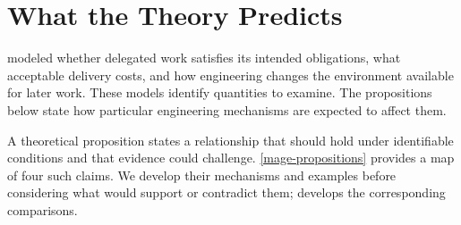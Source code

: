 


\chapter{What the Theory Predicts}


 modeled whether delegated work satisfies its intended obligations, what acceptable delivery costs, and how engineering changes the environment available for later work. These models identify quantities to examine. The propositions below state how particular engineering mechanisms are expected to affect them.

A theoretical proposition states a relationship that should hold under identifiable conditions and that evidence could challenge. \autoref{mage-propositions} provides a map of four such claims. We develop their mechanisms and examples before considering what would support or contradict them;  develops the corresponding comparisons.

